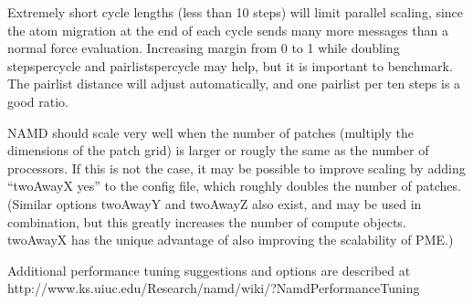 Extremely short cycle lengths (less than 10 steps) will limit parallel
scaling, since the atom migration at the end of each cycle sends many
more messages than a normal force evaluation.  Increasing margin from
0 to 1 while doubling stepspercycle and pairlistspercycle may help,
but it is important to benchmark.  The pairlist distance will adjust
automatically, and one pairlist per ten steps is a good ratio.

NAMD should scale very well when the number of patches (multiply the
dimensions of the patch grid) is larger or rougly the same as the
number of processors.  If this is not the case, it may be possible
to improve scaling by adding ``twoAwayX yes'' to the config file,
which roughly doubles the number of patches.  (Similar options
twoAwayY and twoAwayZ also exist, and may be used in combination,
but this greatly increases the number of compute objects.  twoAwayX
has the unique advantage of also improving the scalability of PME.)
  

Additional performance tuning suggestions and options are described
at http://www.ks.uiuc.edu/Research/namd/wiki/?NamdPerformanceTuning

